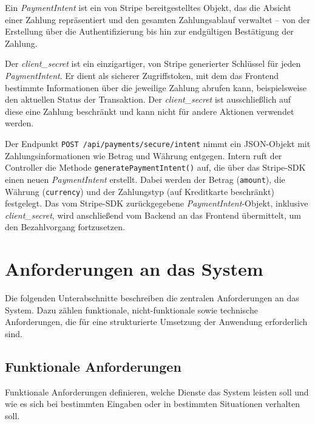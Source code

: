 \noindent Ein \textit{PaymentIntent} ist ein von Stripe bereitgestelltes Objekt, das die Absicht einer Zahlung repräsentiert und den gesamten Zahlungsablauf verwaltet – von der Erstellung über die Authentifizierung bis hin zur endgültigen Bestätigung der Zahlung.

\noindent Der \textit{client\_secret} ist ein einzigartiger, von Stripe generierter Schlüssel für jeden \textit{PaymentIntent}. Er dient als sicherer Zugriffstoken, mit dem das Frontend bestimmte Informationen über die jeweilige Zahlung abrufen kann, beispielsweise den aktuellen Status der Transaktion. Der \textit{client\_secret} ist ausschließlich auf diese eine Zahlung beschränkt und kann nicht für andere Aktionen verwendet werden. 

\noindent Der Endpunkt \texttt{POST /api/payments/secure/intent} nimmt ein JSON-Objekt mit Zahlungsinformationen wie Betrag und Währung entgegen. Intern ruft der Controller die Methode \texttt{generatePaymentIntent()} auf, die über das Stripe-SDK einen neuen \textit{PaymentIntent} erstellt. Dabei werden der Betrag (\texttt{amount}), die Währung (\texttt{currency}) und der Zahlungstyp (auf Kreditkarte beschränkt) festgelegt. Das vom Stripe-SDK zurückgegebene \textit{PaymentIntent}-Objekt, inklusive \textit{client\_secret}, wird anschließend vom Backend an das Frontend übermittelt, um den Bezahlvorgang fortzusetzen.

\section{Anforderungen an das System}

Die folgenden Unterabschnitte beschreiben die zentralen Anforderungen an das System. Dazu zählen funktionale, nicht-funktionale sowie technische Anforderungen, die für eine strukturierte Umsetzung der Anwendung erforderlich sind.

\subsection{Funktionale Anforderungen}


Funktionale Anforderungen definieren, welche Dienste das System leisten soll und wie es sich bei bestimmten Eingaben oder in bestimmten Situationen verhalten soll.


